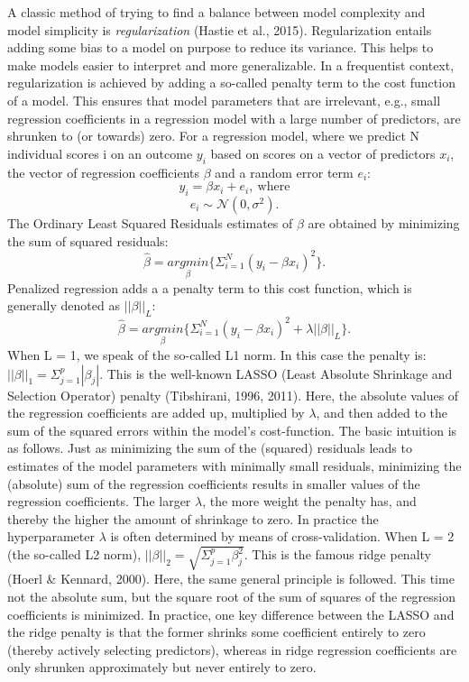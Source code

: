 \documentclass[
  man, donotrepeattitle,floatsintext]{apa6}
\begin{document}
A classic method of trying to find a balance between model complexity
and model simplicity is \emph{regularization} (Hastie et al., 2015).
Regularization entails adding some bias to a model on purpose to reduce
its variance. This helps to make models easier to interpret and more
generalizable. In a frequentist context, regularization is achieved by
adding a so-called penalty term to the cost function of a model. This
ensures that model parameters that are irrelevant, e.g., small
regression coefficients in a regression model with a large number of
predictors, are shrunken to (or towards) zero. For a regression model,
where we predict N individual scores i on an outcome \(y_i\) based on
scores on a vector of predictors \(x_i\), the vector of regression
coefficients \(\beta\) and a random error term \(e_i\):
\[y_i = \beta x_i + e_i, \ \text{where} \]
\[e_i \sim \mathcal{N}(0, \sigma^2). \] The Ordinary Least Squared
Residuals estimates of \(\beta\) are obtained by minimizing the sum of
squared residuals:
\[ \hat{\beta} = \underset{\beta}{argmin} \{ \Sigma_{i=1}^N(y_i - \beta x_{i} )^2 \}.\]
Penalized regression adds a a penalty term to this cost function, which
is generally denoted as \(||\beta||_L\):
\[ \hat{\beta} = \underset{\beta}{argmin} \{ \Sigma_{i=1}^N(y_i - \beta x_{i} )^2 + \lambda ||\beta||_{L} \}.\]
When L = 1, we speak of the so-called L1 norm. In this case the penalty
is: \(||\beta||_1 = \Sigma_{j=1}^p |\beta_j|\). This is the well-known
LASSO (Least Absolute Shrinkage and Selection Operator) penalty
(Tibshirani, 1996, 2011). Here, the
absolute values of the regression coefficients are added up, multiplied
by \(\lambda\), and then added to the sum of the squared errors within the
model's cost-function. The basic intuition is as follows. Just as
minimizing the sum of the (squared) residuals leads to estimates of the
model parameters with minimally small residuals, minimizing the
(absolute) sum of the regression coefficients results in smaller values
of the regression coefficients. The larger \(\lambda\), the more weight
the penalty has, and thereby the higher the amount of shrinkage to zero.
In practice the hyperparameter \(\lambda\) is often determined by means of
cross-validation. When L = 2 (the so-called L2 norm),
\(||\beta||_2 = \sqrt{\Sigma_{j=1}^p \beta_j^2}\). This is the famous
ridge penalty (Hoerl \& Kennard, 2000). Here, the same general principle is
followed. This time not the absolute sum, but the square root of the sum
of squares of the regression coefficients is minimized. In practice, one
key difference between the LASSO and the ridge penalty is that the
former shrinks some coefficient entirely to zero (thereby actively
selecting predictors), whereas in ridge regression coefficients are only
shrunken approximately but never entirely to zero.
\end{document}
